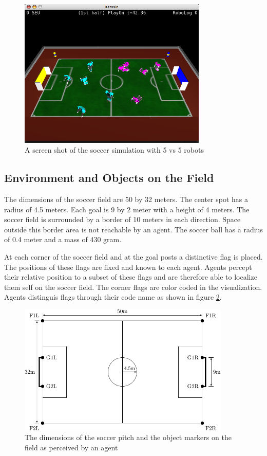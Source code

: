 \begin{figure}[htp]
  \centering
  \includegraphics[width=0.8\textwidth]{fig/soccersim}
  \caption{A screen shot of the soccer simulation with 5 vs 5 robots}
  \label{fig:soccersim}
\end{figure}

\subsection{Environment and Objects on the Field}

The dimensions of the soccer field are 50 by 32 meters. The center
spot has a radius of 4.5 meters. Each goal is 9 by 2 meter with a
height of 4 meters. The soccer field is surrounded by a border of 10
meters in each direction. Space outside this border area is not
reachable by an agent. The soccer ball has a radius of 0.4 meter and a
mass of 430 gram.

At each corner of the soccer field and at the goal posts a distinctive
flag is placed. The positions of these flags are fixed and known to
each agent. Agents percept their relative position to a subset of
these flags and are therefore able to localize them self on the soccer
field. The corner flags are color coded in the visualization. Agents
distinguis flags through their code name as shown in figure
\ref{fig:pitch}.

\begin{figure}[htp]
  \centering
  \includegraphics[width=0.9\textwidth]{fig/pitch}
  \caption{The dimensions of the soccer pitch and the object markers on the field as perceived by an agent}
  \label{fig:pitch}
\end{figure}

